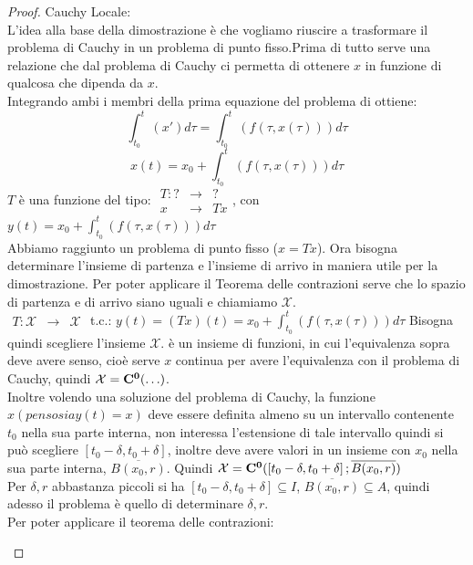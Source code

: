 \begin{proof}
	Cauchy Locale:\\
	L'idea alla base della dimostrazione è che vogliamo riuscire a trasformare il problema di Cauchy in un problema di punto fisso.Prima di tutto serve una relazione che dal problema di Cauchy ci permetta di ottenere $x$ in funzione di qualcosa che dipenda da $x$.\\
	Integrando ambi i membri della prima equazione del problema di ottiene:
	$$\int_{t_0}^{t}( x')d\tau=\int_{t_0}^{t}(f(\tau,x(\tau)))d\tau$$
	$$x(t)=x_0+\int_{t_0}^{t}(f(\tau,x(\tau)))d\tau$$
	$T$ è una funzione del tipo:
	$\begin{array}{rcl} T: ? & \to & ? \\ x & \to & Tx \end{array}$, con $y(t)=x_0+\int_{t_0}^{t}(f(\tau,x(\tau)))d\tau$\\
	Abbiamo raggiunto un problema di punto fisso ($x=Tx$). Ora bisogna determinare l'insieme di partenza e l'insieme di arrivo in maniera utile per la dimostrazione. Per poter applicare il Teorema delle contrazioni serve che lo spazio di partenza e di arrivo siano uguali e chiamiamo $\mathcal{X}$.\\
	$\begin{array}{rcl} T: \mathcal{X} & \to & \mathcal{X} \end{array}$ t.c.: $y(t)=(Tx)(t)=x_0+\int_{t_0}^{t}(f(\tau,x(\tau)))d\tau$
	Bisogna quindi scegliere l'insieme $\mathcal{X}$. è un insieme di funzioni, in cui l'equivalenza sopra deve avere senso, cioè serve $x$ continua per avere l'equivalenza con il problema di Cauchy, quindi $\mathcal{X}=\mathbf{C^{0}}(\ldots)$.\\
	Inoltre volendo una soluzione del problema di Cauchy, la funzione $x(penso sia y(t)=x)$ deve essere definita almeno su un intervallo contenente $t_0$ nella sua parte interna, non interessa l'estensione di tale intervallo quindi si può scegliere $\left[t_0-\delta,t_0+\delta\right]$, inoltre deve avere valori in un insieme con $x_0$ nella sua parte interna, $\overline{B(x_0,r)}$. Quindi $\mathcal{X}=\mathbf{C^{0}}(\left[t_0-\delta,t_0+\delta\right];\overline{B(x_0,r)})$\\
	Per $\delta, r$ abbastanza piccoli si ha $\left[t_0-\delta,t_0+\delta\right]\subseteq I$, $\overline{B(x_0,r)}\subseteq A$, quindi adesso il problema è quello di determinare $\delta, r$.\\
	Per poter applicare il teorema delle contrazioni:
	\begin{description}

\end{description}
\end{proof}
